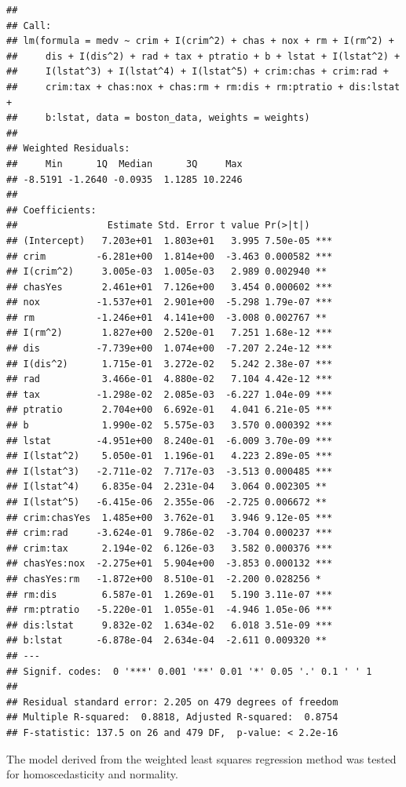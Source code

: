 \documentclass[
]{article}
\begin{document}
\begin{verbatim}
## 
## Call:
## lm(formula = medv ~ crim + I(crim^2) + chas + nox + rm + I(rm^2) + 
##     dis + I(dis^2) + rad + tax + ptratio + b + lstat + I(lstat^2) + 
##     I(lstat^3) + I(lstat^4) + I(lstat^5) + crim:chas + crim:rad + 
##     crim:tax + chas:nox + chas:rm + rm:dis + rm:ptratio + dis:lstat + 
##     b:lstat, data = boston_data, weights = weights)
## 
## Weighted Residuals:
##     Min      1Q  Median      3Q     Max 
## -8.5191 -1.2640 -0.0935  1.1285 10.2246 
## 
## Coefficients:
##                Estimate Std. Error t value Pr(>|t|)    
## (Intercept)   7.203e+01  1.803e+01   3.995 7.50e-05 ***
## crim         -6.281e+00  1.814e+00  -3.463 0.000582 ***
## I(crim^2)     3.005e-03  1.005e-03   2.989 0.002940 ** 
## chasYes       2.461e+01  7.126e+00   3.454 0.000602 ***
## nox          -1.537e+01  2.901e+00  -5.298 1.79e-07 ***
## rm           -1.246e+01  4.141e+00  -3.008 0.002767 ** 
## I(rm^2)       1.827e+00  2.520e-01   7.251 1.68e-12 ***
## dis          -7.739e+00  1.074e+00  -7.207 2.24e-12 ***
## I(dis^2)      1.715e-01  3.272e-02   5.242 2.38e-07 ***
## rad           3.466e-01  4.880e-02   7.104 4.42e-12 ***
## tax          -1.298e-02  2.085e-03  -6.227 1.04e-09 ***
## ptratio       2.704e+00  6.692e-01   4.041 6.21e-05 ***
## b             1.990e-02  5.575e-03   3.570 0.000392 ***
## lstat        -4.951e+00  8.240e-01  -6.009 3.70e-09 ***
## I(lstat^2)    5.050e-01  1.196e-01   4.223 2.89e-05 ***
## I(lstat^3)   -2.711e-02  7.717e-03  -3.513 0.000485 ***
## I(lstat^4)    6.835e-04  2.231e-04   3.064 0.002305 ** 
## I(lstat^5)   -6.415e-06  2.355e-06  -2.725 0.006672 ** 
## crim:chasYes  1.485e+00  3.762e-01   3.946 9.12e-05 ***
## crim:rad     -3.624e-01  9.786e-02  -3.704 0.000237 ***
## crim:tax      2.194e-02  6.126e-03   3.582 0.000376 ***
## chasYes:nox  -2.275e+01  5.904e+00  -3.853 0.000132 ***
## chasYes:rm   -1.872e+00  8.510e-01  -2.200 0.028256 *  
## rm:dis        6.587e-01  1.269e-01   5.190 3.11e-07 ***
## rm:ptratio   -5.220e-01  1.055e-01  -4.946 1.05e-06 ***
## dis:lstat     9.832e-02  1.634e-02   6.018 3.51e-09 ***
## b:lstat      -6.878e-04  2.634e-04  -2.611 0.009320 ** 
## ---
## Signif. codes:  0 '***' 0.001 '**' 0.01 '*' 0.05 '.' 0.1 ' ' 1
## 
## Residual standard error: 2.205 on 479 degrees of freedom
## Multiple R-squared:  0.8818, Adjusted R-squared:  0.8754 
## F-statistic: 137.5 on 26 and 479 DF,  p-value: < 2.2e-16
\end{verbatim}

The model derived from the weighted least squares regression method was
tested for homoscedasticity and normality.
\end{document}
